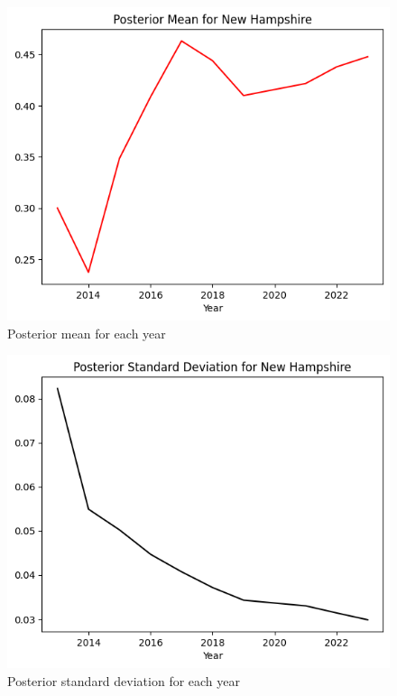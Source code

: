\begin{figure}[!ht]
  \centering
  \includegraphics[width=.6\textwidth]{Project1/Report/images/posterior-mean.png}
  \caption{Posterior mean for each year}
\end{figure}

\begin{figure}[!ht]
  \centering
  \includegraphics[width=.6\textwidth]{Project1/Report/images/posterior-sd.png}
  \caption{Posterior standard deviation for each year}
\end{figure}

